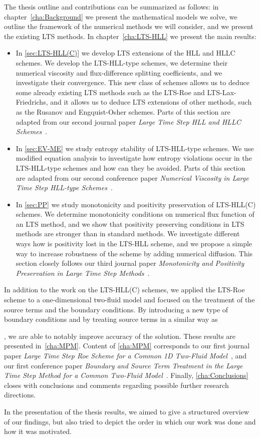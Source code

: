 The thesis outline and contributions can be summarized as follows: in chapter~\ref{cha:Background} we present the mathematical models we solve, we outline the framework of the numerical methods we will consider, and we present the existing LTS methods. In chapter~\ref{cha:LTS-HLL} we present the main results:
\begin{itemize}
\item In \cref{sec:LTS-HLL(C)} we develop LTS extensions of the HLL and HLLC schemes. We develop the LTS-HLL-type schemes, we determine their numerical viscosity and flux-difference splitting coefficients, and we investigate their convergence. This new class of schemes allows us to deduce some already existing LTS methods such as the LTS-Roe and LTS-Lax-Friedrichs, and it allows us to deduce LTS extensions of other methods, such as the Rusanov and Engquist-Osher schemes. Parts of this section are adapted from our second journal paper \textit{Large Time Step HLL and HLLC Schemes}~\cite{jp2}.

\item In \cref{sec:EV-ME} we study entropy stability of LTS-HLL-type schemes. We use modified equation analysis to investigate how entropy violations occur in the LTS-HLL-type schemes and how can they be avoided. Parts of this section are adapted from our second conference paper \textit{Numerical Viscosity in Large Time Step HLL-type Schemes}~\cite{cp2}.

\item In \cref{sec:PP} we study monotonicity and positivity preservation of LTS-HLL(C) schemes. We determine monotonicity conditions on numerical flux function of an LTS method, and we show that positivity preserving conditions in LTS methods are stronger than in standard methods. We investigate different ways how is positivity lost in the LTS-HLL scheme, and we propose a simple way to increase robustness of the scheme by adding numerical diffusion. This section closely follows our third journal paper \textit{Monotonicity and Positivity Preservation in Large Time Step Methods}~\cite{jp3}.
\end{itemize}

In addition to the work on the LTS-HLL(C) schemes, we applied the LTS-Roe scheme to a one-dimensional two-fluid model and focused on the treatment of the source terms and the boundary conditions. By introducing a new type of boundary conditions and by treating source terms in a similar way as 


, we are able to notably improve accuracy of the solution. These results are presented in~\cref{cha:MPM}. Content of \cref{cha:MPM} corresponds to our first journal paper \textit{Large Time Step Roe Scheme for a Common 1D Two-Fluid Model}~\cite{jp1}, and our first conference paper \textit{Boundary and Source Term Treatment in the Large Time Step Method for a Common Two-Fluid Model}~\cite{cp1}. Finally, \cref{cha:Conclusions} closes with conclusions and comments regarding possible further research directions.

In the presentation of the thesis results, we aimed to give a structured overview of our findings, but also tried to depict the order in which our work was done and how it was motivated.

